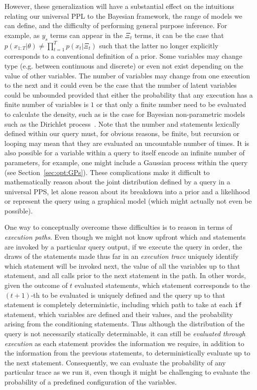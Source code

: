 However, these generalization will have a substantial effect on the intuitions relating our universal
PPL to the Bayesian framework, the range of models we can define, and the difficulty of performing
general purpose inference.  For example, as $y_s$ terms can appear in the $\Xi_t$ terms,
it can be the case that $p(x_{1:T} | \theta) \neq \prod_{t=1}^{T} p(x_t | \Xi_t)$ such that the latter no
longer explicitly corresponds to a conventional definition of a prior.  Some variables may change type (e.g.
between continuous and discrete) or even not exist depending on the value of other variables.  The number
of variables may change from one execution to the next and it could even be the case that the number
of latent variables could be unbounded provided that either the probability that any execution has a 
finite number of variables is $1$ or that only a finite number need to be evaluated to calculate the density, such
as is the case for Bayesian non-parametric models such as the Dirichlet process~\citep{ferguson1973bayesian,teh2011dirichlet}.
Note that the number \sample and \observe statements lexically defined within our query must,
for obvious reasons, be finite, but recursion or looping may mean that they are evaluated an uncountable
number of times.  It is also possible for a variable within a query to itself encode an
infinite number of parameters, for example, one might include a Gaussian process within the query (see Section~\ref{sec:opt:GPs}).
These complications make it difficult to mathematically reason about the joint distribution defined by a query in a
universal PPS, let alone reason about its breakdown into a prior and a likelihood or represent the query
using a graphical model (which might actually not even be possible).

One way to conceptually overcome these difficulties is to reason in terms of \emph{execution paths}.
Even though we might not know upfront which \sample and \observe statements are invoked by
a particular query output, if we execute the query in order, the draws of the \sample statements made
thus far in an \emph{execution trace} uniquely identify which \sample statement will be invoked next, the value of all the variables up
to that \sample statement, and all \observe calls prior to the next \sample statement in the path.  
In other words, given the outcome of $t$ evaluated \sample statements, which \sample statement corresponds
to the $(t+1)$-th to be evaluated is uniquely defined and the query up to that \sample statement is
completely deterministic, including which path to take at each \texttt{if} statement, which variables are defined
and their values, and the probability arising from the \observe conditioning statements.
Thus although the distribution of the query is not necessarily statically
determinable, it can still be \emph{evaluated through execution} as each \sample statement provides
the information we require, in addition to the information from the previous \sample statements, to deterministically evaluate
up to the next \sample statement.
Consequently, we can evaluate the probability of any particular trace as we run it, even though it might
be challenging to evaluate the probability of a predefined configuration of the variables.

